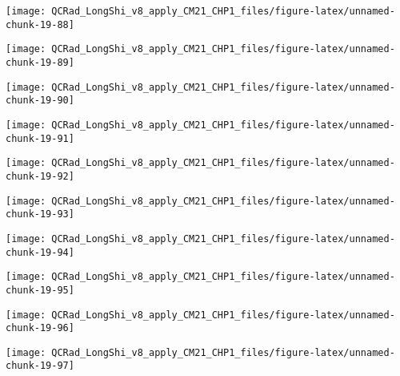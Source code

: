 \documentclass[
  10pt,
  a4paper,oneside]{article}
\begin{document}
\begin{center}\texttt{[image: QCRad\_LongShi\_v8\_apply\_CM21\_CHP1\_files/figure-latex/unnamed-chunk-19-88]} \end{center}

\begin{center}\texttt{[image: QCRad\_LongShi\_v8\_apply\_CM21\_CHP1\_files/figure-latex/unnamed-chunk-19-89]} \end{center}

\begin{center}\texttt{[image: QCRad\_LongShi\_v8\_apply\_CM21\_CHP1\_files/figure-latex/unnamed-chunk-19-90]} \end{center}

\begin{center}\texttt{[image: QCRad\_LongShi\_v8\_apply\_CM21\_CHP1\_files/figure-latex/unnamed-chunk-19-91]} \end{center}

\begin{center}\texttt{[image: QCRad\_LongShi\_v8\_apply\_CM21\_CHP1\_files/figure-latex/unnamed-chunk-19-92]} \end{center}

\begin{center}\texttt{[image: QCRad\_LongShi\_v8\_apply\_CM21\_CHP1\_files/figure-latex/unnamed-chunk-19-93]} \end{center}

\begin{center}\texttt{[image: QCRad\_LongShi\_v8\_apply\_CM21\_CHP1\_files/figure-latex/unnamed-chunk-19-94]} \end{center}

\begin{center}\texttt{[image: QCRad\_LongShi\_v8\_apply\_CM21\_CHP1\_files/figure-latex/unnamed-chunk-19-95]} \end{center}

\begin{center}\texttt{[image: QCRad\_LongShi\_v8\_apply\_CM21\_CHP1\_files/figure-latex/unnamed-chunk-19-96]} \end{center}

\begin{center}\texttt{[image: QCRad\_LongShi\_v8\_apply\_CM21\_CHP1\_files/figure-latex/unnamed-chunk-19-97]} \end{center}
\end{document}
